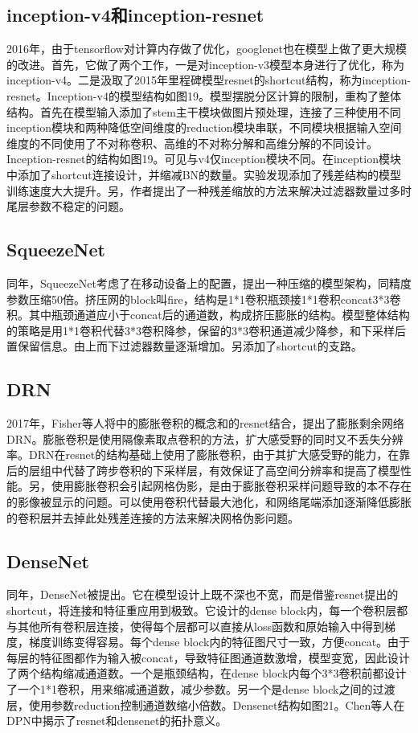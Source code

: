 \documentclass[15pt]{article}
\begin{document}
\subsection{inception-v4和inception-resnet}
2016年，由于tensorflow对计算内存做了优化，googlenet也在模型上做了更大规模的改进\cite{ref75}。首先，它做了两个工作，一是对inception-v3模型本身进行了优化，称为inception-v4。二是汲取了2015年里程碑模型resnet的shortcut结构，称为inception-resnet。Inception-v4的模型结构如图19。模型摆脱分区计算的限制，重构了整体结构。首先在模型输入添加了stem主干模块做图片预处理，连接了三种使用不同inception模块和两种降低空间维度的reduction模块串联，不同模块根据输入空间维度的不同使用了不对称卷积、高维的不对称分解和高维分解的不同设计。Inception-resnet的结构如图19。可见与v4仅inception模块不同。在inception模块中添加了shortcut连接设计，并缩减BN的数量。实验发现添加了残差结构的模型训练速度大大提升。另，作者提出了一种残差缩放的方法来解决过滤器数量过多时尾层参数不稳定的问题。

\subsection{SqueezeNet}
同年，SqueezeNet\cite{ref76}考虑了在移动设备上的配置，提出一种压缩的模型架构，同精度参数压缩50倍。挤压网的block叫fire，结构是1*1卷积瓶颈接1*1卷积concat3*3卷积。其中瓶颈通道应小于concat后的通道数，构成挤压膨胀的结构。模型整体结构的策略是用1*1卷积代替3*3卷积降参，保留的3*3卷积通道减少降参，和下采样后置保留信息。由上而下过滤器数量逐渐增加。另添加了shortcut的支路。

\subsection{DRN}
2017年，Fisher等人将\cite{ref77}中的膨胀卷积的概念和\cite{ref53}的resnet结合，提出了膨胀剩余网络DRN\cite{ref78}。膨胀卷积是使用隔像素取点卷积的方法，扩大感受野的同时又不丢失分辨率。DRN在resnet的结构基础上使用了膨胀卷积，由于其扩大感受野的能力，在靠后的层组中代替了跨步卷积的下采样层，有效保证了高空间分辨率和提高了模型性能。另，使用膨胀卷积会引起网格伪影，是由于膨胀卷积采样问题导致的本不存在的影像被显示的问题。可以使用卷积代替最大池化，和网络尾端添加逐渐降低膨胀的卷积层并去掉此处残差连接的方法来解决网格伪影问题。

\subsection{DenseNet}
同年，DenseNet被提出\cite{ref79}。它在模型设计上既不深也不宽，而是借鉴resnet提出的shortcut，将连接和特征重应用到极致。它设计的dense block内，每一个卷积层都与其他所有卷积层连接，使得每个层都可以直接从loss函数和原始输入中得到梯度，梯度训练变得容易。每个dense block内的特征图尺寸一致，方便concat。由于每层的特征图都作为输入被concat，导致特征图通道数激增，模型变宽，因此设计了两个结构缩减通道数。一个是瓶颈结构，在dense block内每个3*3卷积前都设计了一个1*1卷积，用来缩减通道数，减少参数。另一个是dense block之间的过渡层，使用参数reduction控制通道数缩小倍数。Densenet结构如图21。Chen等人在DPN中揭示了resnet和densenet的拓扑意义\cite{ref70}。
\end{document}
